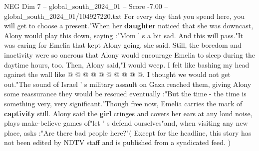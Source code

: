 \begin{textsample}{NEG Dim 7 – global\_south\_2024\_01 – Score -7.00 – global\_south\_2024\_01/104927220.txt}
For every day that you spend here, you will get to choose a present."When her \textbf{daughter} noticed that she was downcast, Alony would play this down, saying :"Mom ' s a bit sad.
And this will pass."It was caring for Emelia that kept Alony going, she said.
Still, the boredom and inactivity were so onerous that Alony would encourage Emelia to sleep during the daytime hours, too.
Then, Alony said,"I would weep.
I felt like bashing my head against the wall like @ @ @ @ @ @ @ @ @ @.
I thought we would not get out."The sound of Israel ' s military assault on Gaza reached them, giving Alony some reassurance they would be rescued eventually :"But the time - the time is something very, very significant."Though free now, Emelia carries the mark of \textbf{captivity} still.
Alony said the \textbf{girl} cringes and covers her ears at any loud noise, plays make-believe games of"let ' s defend ourselves"and, when visiting any new place, asks :"Are there bad people here?"( Except for the headline, this story has not been edited by NDTV staff and is published from a syndicated feed. )

\end{textsample}
